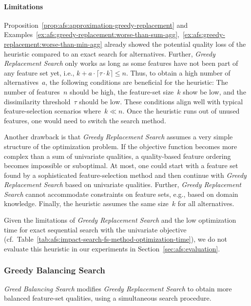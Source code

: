 \documentclass{article}
\theoremstyle{definition}
\begin{document}
\paragraph{Limitations}

Proposition~\ref{prop:afs:approximation-greedy-replacement} and Examples~\ref{ex:afs:greedy-replacement:worse-than-sum-agg},~\ref{ex:afs:greedy-replacement:worse-than-min-agg} already showed the potential quality loss of the heuristic compared to an exact search for alternatives.
Further, \emph{Greedy Replacement Search} only works as long as some features have not been part of any feature set yet, i.e., $k + a \cdot \lceil \tau \cdot k \rceil \leq n$.
Thus, to obtain a high number of alternatives~$a$, the following conditions are beneficial for the heuristic:
The number of features~$n$ should be high, the feature-set size~$k$ show be low, and the dissimilarity threshold~$\tau$ should be low.
These conditions align well with typical feature-selection scenarios where~$k \ll n$.
Once the heuristic runs out of unused features, one would need to switch the search method.

Another drawback is that \emph{Greedy Replacement Search} assumes a very simple structure of the optimization problem.
If the objective function becomes more complex than a sum of univariate qualities, a quality-based feature ordering becomes impossible or suboptimal.
At most, one could start with a feature set found by a sophisticated feature-selection method and then continue with \emph{Greedy Replacement Search} based on univariate qualities.
Further, \emph{Greedy Replacement Search} cannot accommodate constraints on feature sets, e.g., based on domain knowledge.
Finally, the heuristic assumes the same size~$k$ for all alternatives.

Given the limitations of \emph{Greedy Replacement Search} and the low optimization time for exact sequential search with the univariate objective (cf.~Table~\ref{tab:afs:impact-search-fs-method-optimization-time}), we do not evaluate this heuristic in our experiments in Section~\ref{sec:afs:evaluation}.

\subsubsection{Greedy Balancing Search}
\label{sec:afs:appendix:univariate-search:greedy-balancing}

\emph{Greed Balancing Search} modifies \emph{Greedy Replacement Search} to obtain more balanced feature-set qualities, using a simultaneous search procedure.
\end{document}

